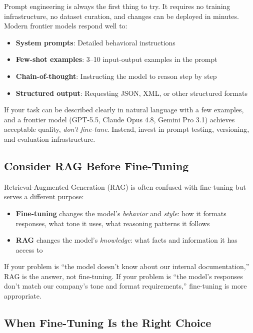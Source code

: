 Prompt engineering is always the first thing to try. It requires no training infrastructure, no dataset curation, and changes can be deployed in minutes. Modern frontier models respond well to:

\begin{itemize}[leftmargin=*]
    \item \textbf{System prompts}: Detailed behavioral instructions
    \item \textbf{Few-shot examples}: 3--10 input-output examples in the prompt
    \item \textbf{Chain-of-thought}: Instructing the model to reason step by step
    \item \textbf{Structured output}: Requesting JSON, XML, or other structured formats
\end{itemize}

\begin{tipbox}
If your task can be described clearly in natural language with a few examples, and a frontier model (GPT-5.5, Claude Opus 4.8, Gemini Pro 3.1) achieves acceptable quality, \emph{don't fine-tune}. Instead, invest in prompt testing, versioning, and evaluation infrastructure.
\end{tipbox}

\subsection{Consider RAG Before Fine-Tuning}

Retrieval-Augmented Generation (RAG) is often confused with fine-tuning but serves a different purpose:

\begin{itemize}[leftmargin=*]
    \item \textbf{Fine-tuning} changes the model's \emph{behavior} and \emph{style}: how it formats responses, what tone it uses, what reasoning patterns it follows
    \item \textbf{RAG} changes the model's \emph{knowledge}: what facts and information it has access to
\end{itemize}

If your problem is ``the model doesn't know about our internal documentation,'' RAG is the answer, not fine-tuning. If your problem is ``the model's responses don't match our company's tone and format requirements,'' fine-tuning is more appropriate.

\subsection{When Fine-Tuning Is the Right Choice}

